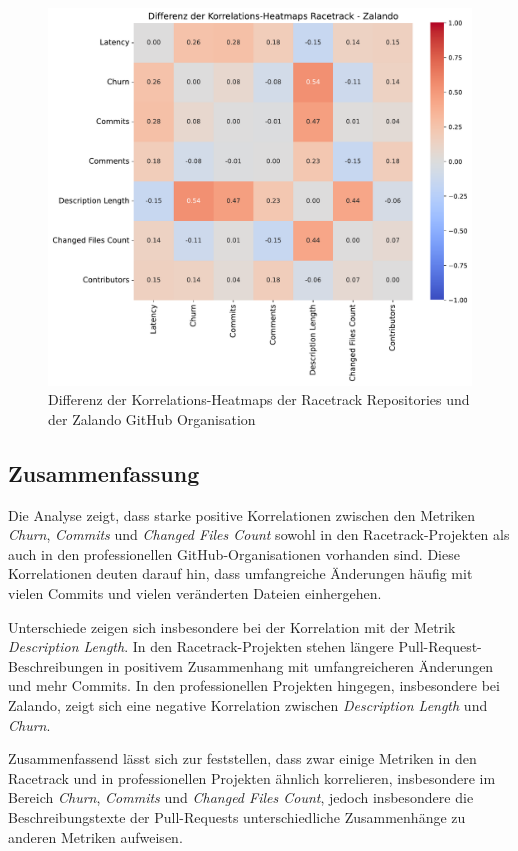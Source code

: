 \begin{figure}[htbp]
\includegraphics[width=\textwidth]{Figures/diff-korrelationsmatrix-racetrack-zalando.pdf}
\caption{Differenz der Korrelations-Heatmaps der Racetrack Repositories und der Zalando GitHub Organisation}
\label{fig:diff-korrelationsmatrix-racetrack-zalando}
\end{figure}

\newpage

\subsection{Zusammenfassung}
Die Analyse zeigt, dass starke positive Korrelationen zwischen den Metriken \textit{Churn}, \textit{Commits} und \textit{Changed Files Count} sowohl in den Racetrack-Projekten als auch in den professionellen GitHub-Organisationen vorhanden sind. Diese Korrelationen deuten darauf hin, dass umfangreiche Änderungen häufig mit vielen Commits und vielen veränderten Dateien einhergehen.

Unterschiede zeigen sich insbesondere bei der Korrelation mit der Metrik \textit{Description Length}. In den Racetrack-Projekten stehen längere Pull-Request-Beschreibungen in positivem Zusammenhang mit umfangreicheren Änderungen und mehr Commits. 
In den professionellen Projekten hingegen, insbesondere bei Zalando, zeigt sich eine negative Korrelation zwischen \textit{Description Length} und \textit{Churn}. 

Zusammenfassend lässt sich zur  feststellen, dass zwar einige Metriken in den Racetrack und in professionellen Projekten ähnlich korrelieren, insbesondere im Bereich \textit{Churn}, \textit{Commits} und \textit{Changed Files Count}, jedoch insbesondere die Beschreibungstexte der Pull-Requests unterschiedliche Zusammenhänge zu anderen Metriken aufweisen.

\newpage




